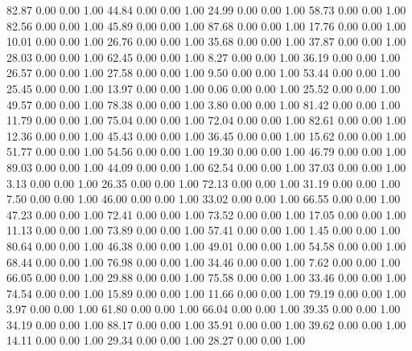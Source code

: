    82.87   0.00   0.00   1.00
   44.84   0.00   0.00   1.00
   24.99   0.00   0.00   1.00
   58.73   0.00   0.00   1.00
   82.56   0.00   0.00   1.00
   45.89   0.00   0.00   1.00
   87.68   0.00   0.00   1.00
   17.76   0.00   0.00   1.00
   10.01   0.00   0.00   1.00
   26.76   0.00   0.00   1.00
   35.68   0.00   0.00   1.00
   37.87   0.00   0.00   1.00
   28.03   0.00   0.00   1.00
   62.45   0.00   0.00   1.00
    8.27   0.00   0.00   1.00
   36.19   0.00   0.00   1.00
   26.57   0.00   0.00   1.00
   27.58   0.00   0.00   1.00
    9.50   0.00   0.00   1.00
   53.44   0.00   0.00   1.00
   25.45   0.00   0.00   1.00
   13.97   0.00   0.00   1.00
    0.06   0.00   0.00   1.00
   25.52   0.00   0.00   1.00
   49.57   0.00   0.00   1.00
   78.38   0.00   0.00   1.00
    3.80   0.00   0.00   1.00
   81.42   0.00   0.00   1.00
   11.79   0.00   0.00   1.00
   75.04   0.00   0.00   1.00
   72.04   0.00   0.00   1.00
   82.61   0.00   0.00   1.00
   12.36   0.00   0.00   1.00
   45.43   0.00   0.00   1.00
   36.45   0.00   0.00   1.00
   15.62   0.00   0.00   1.00
   51.77   0.00   0.00   1.00
   54.56   0.00   0.00   1.00
   19.30   0.00   0.00   1.00
   46.79   0.00   0.00   1.00
   89.03   0.00   0.00   1.00
   44.09   0.00   0.00   1.00
   62.54   0.00   0.00   1.00
   37.03   0.00   0.00   1.00
    3.13   0.00   0.00   1.00
   26.35   0.00   0.00   1.00
   72.13   0.00   0.00   1.00
   31.19   0.00   0.00   1.00
    7.50   0.00   0.00   1.00
   46.00   0.00   0.00   1.00
   33.02   0.00   0.00   1.00
   66.55   0.00   0.00   1.00
   47.23   0.00   0.00   1.00
   72.41   0.00   0.00   1.00
   73.52   0.00   0.00   1.00
   17.05   0.00   0.00   1.00
   11.13   0.00   0.00   1.00
   73.89   0.00   0.00   1.00
   57.41   0.00   0.00   1.00
    1.45   0.00   0.00   1.00
   80.64   0.00   0.00   1.00
   46.38   0.00   0.00   1.00
   49.01   0.00   0.00   1.00
   54.58   0.00   0.00   1.00
   68.44   0.00   0.00   1.00
   76.98   0.00   0.00   1.00
   34.46   0.00   0.00   1.00
    7.62   0.00   0.00   1.00
   66.05   0.00   0.00   1.00
   29.88   0.00   0.00   1.00
   75.58   0.00   0.00   1.00
   33.46   0.00   0.00   1.00
   74.54   0.00   0.00   1.00
   15.89   0.00   0.00   1.00
   11.66   0.00   0.00   1.00
   79.19   0.00   0.00   1.00
    3.97   0.00   0.00   1.00
   61.80   0.00   0.00   1.00
   66.04   0.00   0.00   1.00
   39.35   0.00   0.00   1.00
   34.19   0.00   0.00   1.00
   88.17   0.00   0.00   1.00
   35.91   0.00   0.00   1.00
   39.62   0.00   0.00   1.00
   14.11   0.00   0.00   1.00
   29.34   0.00   0.00   1.00
   28.27   0.00   0.00   1.00
